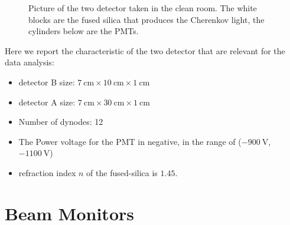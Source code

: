 \begin{figure}[hbtp]
\centering
{} \quad
{} \quad
	\label{fig:Detectors}
\caption{Picture of the two detector taken in the clean room. The white blocks are the fused silica that produces the Cherenkov light, the cylinders below are the PMTs.}
\end{figure}

Here we report the characteristic of the two detector that are relevant for the data analysis: 

\begin{itemize}
\item detector B size: $\SI{7}{\centi \meter} \times \SI{10}{\centi \meter} \times \SI{1}{\centi \meter}$
\item detector A size: $\SI{7}{\centi \meter} \times \SI{30}{\centi \meter} \times \SI{1}{\centi \meter}$
\item Number of dynodes: 12
\item The Power voltage for the PMT in negative, in the range of ($\SI{-900}{\volt}$, $\SI{-1100}{\volt}$)
\item refraction index $n$ of the fused-silica is $1.45$.
\end{itemize}


\section{Beam Monitors}

